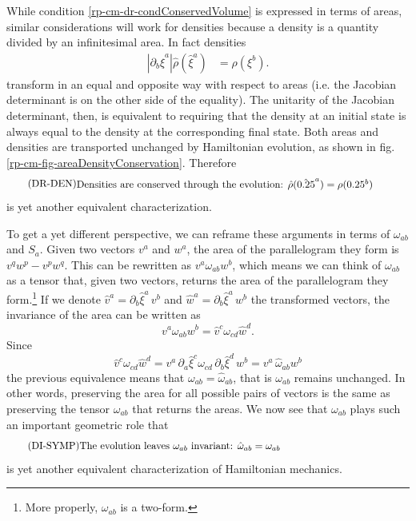 While condition \ref{rp-cm-dr-condConservedVolume} is expressed in terms of areas, similar considerations will work for densities because a density is a quantity divided by an infinitesimal area. In fact densities
\begin{equation}\label{rp-cm-densityTransformation1d}
	\begin{aligned}
		\left| \partial_b \hat{\xi}^a \right| \hat{\rho}(\hat{\xi}^a) &= \rho(\xi^b).
	\end{aligned}	
\end{equation}
transform in an equal and opposite way with respect to areas (i.e. the Jacobian determinant is on the other side of the equality). The unitarity of the Jacobian determinant, then, is equivalent to requiring that the density at an initial state is always equal to the density at the corresponding final state. Both areas and densities are transported unchanged by Hamiltonian evolution, as shown in fig. \ref{rp-cm-fig-areaDensityConservation}. Therefore
\begin{equation}\label{rp-cm-dr-condConservedDensity}
	\tag{DR-DEN}
	\eqtext{Densities are conserved through the evolution: $\hat{\rho}(\hat{\xi}^a) = \rho(\xi^b)$ } 
\end{equation}
is yet another equivalent characterization.

To get a yet different perspective, we can reframe these arguments in terms of $\omega_{ab}$ and $S_a$. Given two vectors $v^a$ and $w^a$, the area of the parallelogram they form is $v^q w^p - v^p w^q$. This can be rewritten as $v^a \omega_{ab} w^b$, which means we can think of $\omega_{ab}$ as a tensor that, given two vectors, returns the area of the parallelogram they form.\footnote{More properly, $\omega_{ab}$ is a two-form.} If we denote $\hat{v}^a = \partial_b \hat{\xi}^a \, v^b$ and $\hat{w}^a = \partial_b \hat{\xi}^a \, w^b$ the transformed vectors, the invariance of the area can be written as
\begin{equation}
	v^a \omega_{ab} w^b = \hat{v}^c \omega_{cd} \hat{w}^d.
\end{equation}
Since
\begin{equation}
	\hat{v}^c \omega_{cd} \hat{w}^d = v^a \, \partial_a \hat{\xi}^c \omega_{cd} \, \partial_b \hat{\xi}^d \, w^b = v^a \, \hat{\omega}_{ab} w^b
\end{equation}
the previous equivalence means that $\omega_{ab} = \hat{\omega}_{ab}$, that is $\omega_{ab}$ remains unchanged. In other words, preserving the area for all possible pairs of vectors is the same as preserving the tensor $\omega_{ab}$ that returns the areas. We now see that $\omega_{ab}$ plays such an important geometric role that
\begin{equation}\label{rp-cm-di-condConservedSymplectic}
	\tag{DI-SYMP}
	\eqtext{The evolution leaves $\omega_{ab}$ invariant: $\hat{\omega}_{ab} = \omega_{ab}$} 
\end{equation}
is yet another equivalent characterization of Hamiltonian mechanics.


